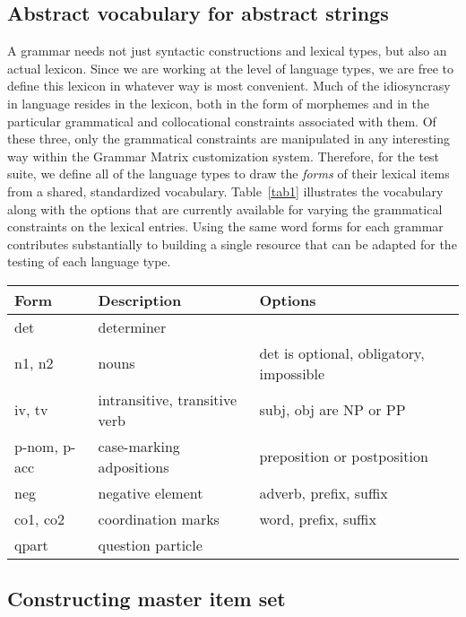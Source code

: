 \documentclass[11pt]{article}
\begin{document}
\subsection{Abstract vocabulary for abstract strings}

A grammar needs not just syntactic
constructions and lexical types, but also an actual lexicon.  Since we
are working at the level of language types,
we are free to define this lexicon in whatever way is most convenient.
Much of the idiosyncrasy in language resides in the lexicon, both in
the form of morphemes and in the particular grammatical and
collocational constraints associated with them.  Of these three, only
the grammatical constraints are manipulated in any interesting way
within the Grammar Matrix customization system.  Therefore, for the
test suite, we define all of the language types to draw the {\it
forms} of their lexical items from a shared, standardized vocabulary.
Table~\ref{tab1} illustrates the vocabulary along with the 
options that are currently available for varying the grammatical
constraints on the lexical entries.  Using the same word forms for
each grammar contributes substantially to building a single resource
that can be adapted for the testing of each language type.

\begin{table*}[ht]
\small
\begin{center}
\begin{tabular}{l|l|l}
\hline
Form & Description & Options \\ \hline \hline
det & determiner & \\ 
n1, n2 & nouns & det is optional, obligatory, impossible\\
iv, tv & intransitive, transitive verb & subj, obj are NP or PP\\
p-nom, p-acc & case-marking adpositions & preposition or postposition\\
neg & negative element & adverb, prefix, suffix\\
co1, co2 & coordination marks & word, prefix, suffix\\
qpart & question particle & \\
\hline
\end{tabular}
\end{center}
\caption{Standardized lexicon}
\label{tab1}
\end{table*}


\subsection{Constructing master item set}
\end{document}
